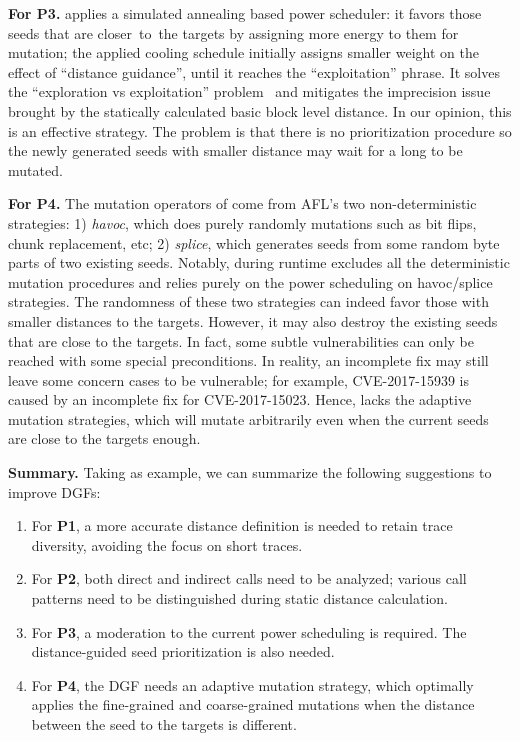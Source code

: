 \textbf{For P3. } 
\aflgo applies a simulated annealing based power scheduler: it favors those seeds that are closer~to~the targets by assigning more energy to them for mutation; the applied cooling schedule initially assigns smaller weight on the effect of ``distance guidance'', until it reaches the ``exploitation'' phrase. It solves the ``exploration vs exploitation'' problem~\cite{eve} and mitigates the imprecision issue brought by the statically calculated basic block level distance. In our opinion, this is an effective strategy. The problem is that there is no prioritization procedure so the newly generated seeds with smaller distance may wait for a long to be mutated.


 
\textbf{For P4. } The mutation operators of \aflgo come from AFL's two non-deterministic strategies: 1) \emph{havoc}, which does purely randomly mutations such as bit flips, chunk replacement, etc; 2) \emph{splice}, which generates seeds from some random byte parts of two existing seeds. 
Notably, during runtime \aflgo excludes all the deterministic mutation procedures and relies purely on the power scheduling on havoc/splice strategies.
The randomness of these two strategies can indeed favor those with smaller distances to the targets.
However, it may also destroy the existing seeds that are close to the targets.
In fact, some subtle vulnerabilities can only be reached with some special preconditions. In reality, an incomplete fix may still leave some concern cases to be vulnerable; for example, CVE-2017-15939 is caused by an incomplete fix for CVE-2017-15023.
Hence, \aflgo lacks the adaptive mutation strategies, which will mutate arbitrarily even when the current seeds are close to the targets enough.


\textbf{Summary.} Taking \aflgo as example, we can summarize the following suggestions to improve DGFs:

\begin{enumerate}[(1)] 
	\itemsep0em
	\item For \textbf{P1}, a more accurate distance definition is needed to retain trace diversity, avoiding the focus on short traces.
	\item For \textbf{P2}, both direct and indirect calls need to be analyzed; various call patterns need to be distinguished during static distance calculation.
	\item For \textbf{P3}, a moderation to the current power scheduling is required. The distance-guided seed prioritization is also needed. 
	\item For \textbf{P4}, the DGF needs an adaptive mutation strategy, which optimally applies the fine-grained and coarse-grained mutations when the distance between the seed to the targets is different.
\end{enumerate}








